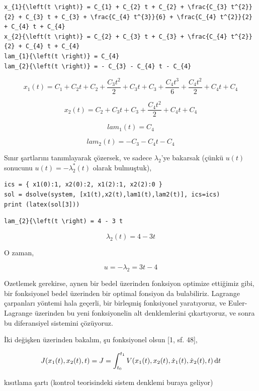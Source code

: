 \documentclass[12pt,fleqn]{article}\usepackage{../../common}
\begin{document}
\begin{verbatim}
x_{1}{\left(t \right)} = C_{1} + C_{2} t + C_{2} + \frac{C_{3} t^{2}}{2} + C_{3} t + C_{3} + \frac{C_{4} t^{3}}{6} + \frac{C_{4} t^{2}}{2} + C_{4} t + C_{4}
x_{2}{\left(t \right)} = C_{2} + C_{3} t + C_{3} + \frac{C_{4} t^{2}}{2} + C_{4} t + C_{4}
lam_{1}{\left(t \right)} = C_{4}
lam_{2}{\left(t \right)} = - C_{3} - C_{4} t - C_{4}
\end{verbatim}

$$
x_{1}{\left(t \right)} = C_{1} + C_{2} t + C_{2} + \frac{C_{3} t^{2}}{2} + C_{3} t + C_{3} + \frac{C_{4} t^{3}}{6} + \frac{C_{4} t^{2}}{2} + C_{4} t + C_{4}
$$

$$
x_{2}{\left(t \right)} = C_{2} + C_{3} t + C_{3} + \frac{C_{4} t^{2}}{2} + C_{4} t + C_{4}
$$

$$
lam_{1}{\left(t \right)} = C_{4}
$$

$$
lam_{2}{\left(t \right)} = - C_{3} - C_{4} t - C_{4}
$$

Sınır şartlarını tanımlayarak çözersek, ve sadece $\lambda_2$'ye
bakarsak (çünkü $u(t)$ sonucunu $u(t) = -\lambda_2^\ast (t)$ olarak bulmuştuk),

\begin{verbatim}
ics = { x1(0):1, x2(0):2, x1(2):1, x2(2):0 } 
sol = dsolve(system, [x1(t),x2(t),lam1(t),lam2(t)], ics=ics)
print (latex(sol[3]))
\end{verbatim}

\begin{verbatim}
lam_{2}{\left(t \right) = 4 - 3 t
\end{verbatim}

$$
\lambda_{2}{\left(t \right)} = 4 - 3 t
$$

O zaman, 

$$
u = -\lambda_2 = 3t - 4
$$

Ozetlemek gerekirse, aynen bir bedel üzerinden fonksiyon optimize ettiğimiz
gibi, bir fonksiyonel bedel üzerinden bir optimal fonsiyon da
bulabiliriz. Lagrange çarpanları yöntemi hala geçerli, bir birleşmiş
fonksiyonel yaratıyoruz, ve Euler-Lagrange üzerinden bu yeni fonksiyonelin
alt denklemlerini çıkartıyoruz, ve sonra bu diferansiyel sistemini
çözüyoruz.

İki değişken üzerinden bakalım, şu fonksiyonel olsun [1, sf. 48], 

$$
J(x_1(t),x_2(t),t) = J = 
\int_{t_0}^{t_1} V(x_1(t), x_2(t), \dot{x}_1(t), \dot{x}_2(t), t) \,\mathrm{d} t
$$

kısıtlama şartı (kontrol teorisindeki sistem denklemi buraya geliyor)
\end{document}
